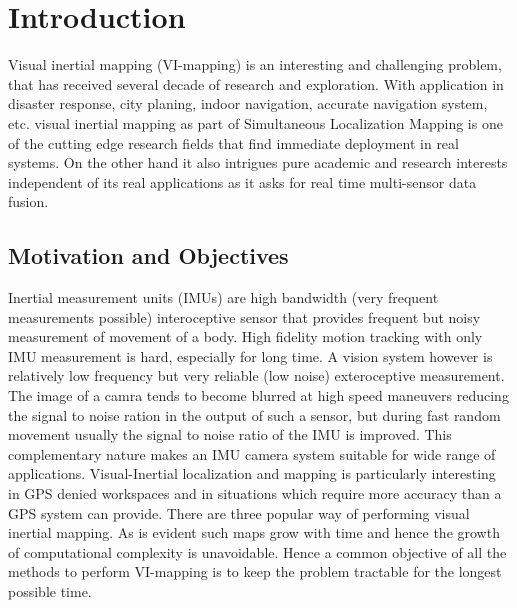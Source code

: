 \chapter{Introduction}
\label{sec:introduction}

Visual inertial mapping (VI-mapping) is an interesting and challenging problem, that has received several decade of research and exploration. With application in disaster response, city planing, indoor navigation, accurate navigation system, etc. visual inertial mapping as part of Simultaneous Localization Mapping is one of the cutting edge research fields that find immediate deployment in real systems. On the other hand it also intrigues pure academic and research interests independent of its real applications as it asks for real time multi-sensor data fusion.

\section{Motivation and Objectives}
Inertial measurement units (IMUs) are high bandwidth (very frequent measurements possible) interoceptive sensor that provides frequent but noisy measurement of movement of a body. High fidelity motion tracking with only IMU measurement is hard, especially for long time. A vision system however is relatively low frequency but very reliable (low noise) exteroceptive measurement. The image of a camra tends to become blurred at high speed maneuvers reducing the signal to noise ration in the output of such a sensor, but during fast random movement usually the signal to noise ratio of the IMU is improved. This complementary nature makes an IMU camera system suitable for wide range of applications. Visual-Inertial localization and mapping is particularly interesting in GPS denied workspaces and in situations which require more accuracy than a GPS system can provide. There are three popular way of performing visual inertial mapping. As is evident such maps grow with time and hence the growth of computational complexity is unavoidable. Hence a common objective of all the methods to perform VI-mapping is to keep the problem tractable for the longest possible time.
